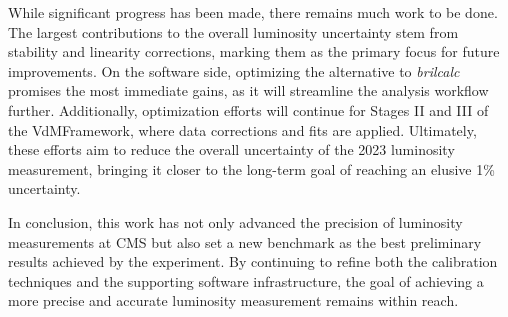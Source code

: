 While significant progress has been made, there remains much work to be done. The largest contributions to the overall luminosity uncertainty stem from stability and linearity corrections, marking them as the primary focus for future improvements. On the software side, optimizing the alternative to \textit{brilcalc} promises the most immediate gains, as it will streamline the analysis workflow further. Additionally, optimization efforts will continue for Stages II and III of the VdMFramework, where data corrections and fits are applied. Ultimately, these efforts aim to reduce the overall uncertainty of the 2023 luminosity measurement, bringing it closer to the long-term goal of reaching an elusive 1\% uncertainty.

In conclusion, this work has not only advanced the precision of luminosity measurements at CMS but also set a new benchmark as the best preliminary results achieved by the experiment. By continuing to refine both the calibration techniques and the supporting software infrastructure, the goal of achieving a more precise and accurate luminosity measurement remains within reach.
